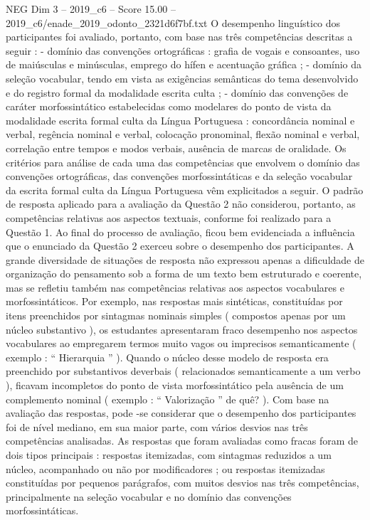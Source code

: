 \begin{textsample}{NEG Dim 3 – 2019\_c6 – Score 15.00 – 2019\_c6/enade\_2019\_odonto\_2321d6f7bf.txt}
O desempenho linguístico dos participantes foi avaliado, portanto, com base nas três competências descritas a seguir : - domínio das convenções ortográficas : grafia de vogais e consoantes, uso de maiúsculas e minúsculas, emprego do hífen e acentuação gráfica ; - domínio da seleção vocabular, tendo em vista as exigências semânticas do tema desenvolvido e do registro formal da modalidade escrita culta ; - domínio das convenções de caráter morfossintático estabelecidas como modelares do ponto de vista da modalidade escrita formal culta da Língua Portuguesa : concordância nominal e verbal, regência nominal e verbal, colocação pronominal, flexão nominal e verbal, correlação entre tempos e modos verbais, ausência de marcas de oralidade.
Os critérios para análise de cada uma das competências que envolvem o domínio das convenções ortográficas, das convenções morfossintáticas e da seleção vocabular da escrita formal culta da Língua Portuguesa vêm explicitados a seguir.
O padrão de resposta aplicado para a avaliação da Questão 2 não considerou, portanto, as competências relativas aos aspectos textuais, conforme foi realizado para a Questão 1.
Ao final do processo de avaliação, ficou bem evidenciada a influência que o enunciado da Questão 2 exerceu sobre o desempenho dos participantes.
A grande diversidade de situações de resposta não expressou apenas a dificuldade de organização do pensamento sob a forma de um texto bem estruturado e coerente, mas se refletiu também nas competências relativas aos aspectos vocabulares e morfossintáticos.
Por exemplo, nas respostas mais sintéticas, constituídas por itens preenchidos por sintagmas nominais simples ( compostos apenas por um núcleo substantivo ), os estudantes apresentaram fraco desempenho nos aspectos vocabulares ao empregarem termos muito vagos ou imprecisos semanticamente ( exemplo : “ Hierarquia ” ).
Quando o núcleo desse modelo de resposta era preenchido por substantivos deverbais ( relacionados semanticamente a um verbo ), ficavam incompletos do ponto de vista morfossintático pela ausência de um complemento nominal ( exemplo : “ Valorização ” de quê? ).
Com base na avaliação das respostas, pode -se considerar que o desempenho dos participantes foi de nível mediano, em sua maior parte, com vários desvios nas três competências analisadas.
As respostas que foram avaliadas como fracas foram de dois tipos principais : respostas itemizadas, com sintagmas reduzidos a um núcleo, acompanhado ou não por modificadores ; ou respostas itemizadas constituídas por pequenos parágrafos, com muitos desvios nas três competências, principalmente na seleção vocabular e no domínio das convenções morfossintáticas.

\end{textsample}
